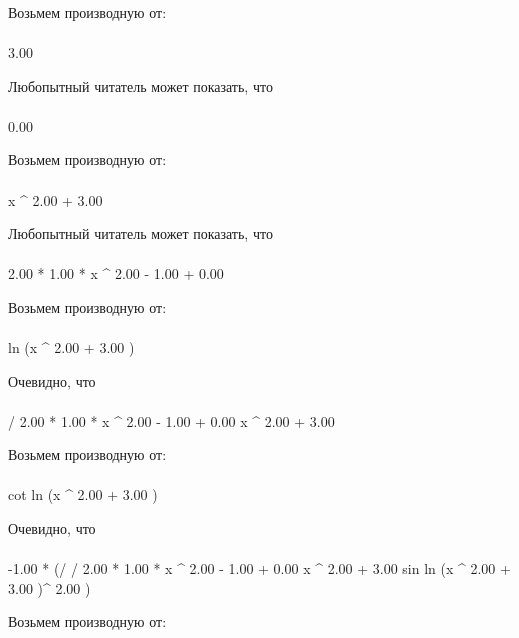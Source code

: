 Возьмем производную от:
\begin{gather}
\end{gather}
\begin{}
3.00 \\
\end{}
Любопытный читатель может показать, что
\begin{gather}
\end{gather}
\begin{}
0.00 \\
\end{}
Возьмем производную от:
\begin{gather}
\end{gather}
\begin{}
x ^ {2.00 }+ 3.00 \\
\end{}
Любопытный читатель может показать, что
\begin{gather}
\end{gather}
\begin{}
2.00 * 1.00 * x ^ {2.00 - 1.00 }+ 0.00 \\
\end{}
Возьмем производную от:
\begin{gather}
\end{gather}
\begin{}
ln (x ^ {2.00 }+ 3.00 )\\
\end{}
Очевидно, что
\begin{gather}
\end{gather}
\begin{}
/ {2.00 * 1.00 * x ^ {2.00 - 1.00 }+ 0.00 }{x ^ {2.00 }+ 3.00 }\\
\end{}
Возьмем производную от:
\begin{gather}
\end{gather}
\begin{}
cot ln (x ^ {2.00 }+ 3.00 )\\
\end{}
Очевидно, что
\begin{gather}
\end{gather}
\begin{}
-1.00 * (/ {/ {2.00 * 1.00 * x ^ {2.00 - 1.00 }+ 0.00 }{x ^ {2.00 }+ 3.00 }}{sin ln (x ^ {2.00 }+ 3.00 )^ {2.00 }})\\
\end{}
Возьмем производную от:
\begin{gather}
\end{gather}
